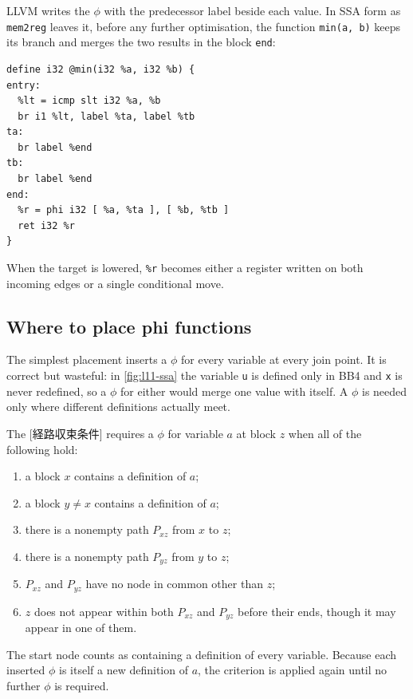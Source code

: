 \documentclass[../main.tex]{subfiles}
\begin{document}
LLVM writes the $\phi$ with the predecessor label beside each value.
In SSA form as \texttt{mem2reg} leaves it, before any further
optimisation, the function \texttt{min(a, b)} keeps its branch and
merges the two results in the block \texttt{end}:
\begin{lstlisting}[numbers=none]
define i32 @min(i32 %a, i32 %b) {
entry:
  %lt = icmp slt i32 %a, %b
  br i1 %lt, label %ta, label %tb
ta:
  br label %end
tb:
  br label %end
end:
  %r = phi i32 [ %a, %ta ], [ %b, %tb ]
  ret i32 %r
}
\end{lstlisting}
%
When the target is lowered, \texttt{\%r} becomes either a register
written on both incoming edges or a single conditional move.

\subsection{Where to place phi functions}

The simplest placement inserts a $\phi$ for every variable at every
join point.  It is correct but wasteful: in \cref{fig:l11-ssa} the
variable \texttt{u} is defined only in BB4 and \texttt{x} is never
redefined, so a $\phi$ for either would merge one value with itself.
A $\phi$ is needed only where different definitions actually meet.

\begin{definition}
  \label{def:l11-path-convergence}
  The [経路収束条件] requires a $\phi$
  for variable $a$ at block $z$ when all of the following hold:
  \begin{enumerate}
    \item a block $x$ contains a definition of $a$;
    \item a block $y \neq x$ contains a definition of $a$;
    \item there is a nonempty path $P_{xz}$ from $x$ to $z$;
    \item there is a nonempty path $P_{yz}$ from $y$ to $z$;
    \item $P_{xz}$ and $P_{yz}$ have no node in common other than $z$;
    \item $z$ does not appear within both $P_{xz}$ and $P_{yz}$ before
      their ends, though it may appear in one of them.
  \end{enumerate}
  The start node counts as containing a definition of every variable.
  Because each inserted $\phi$ is itself a new definition of $a$, the
  criterion is applied again until no further $\phi$ is required.
\end{definition}
\end{document}
